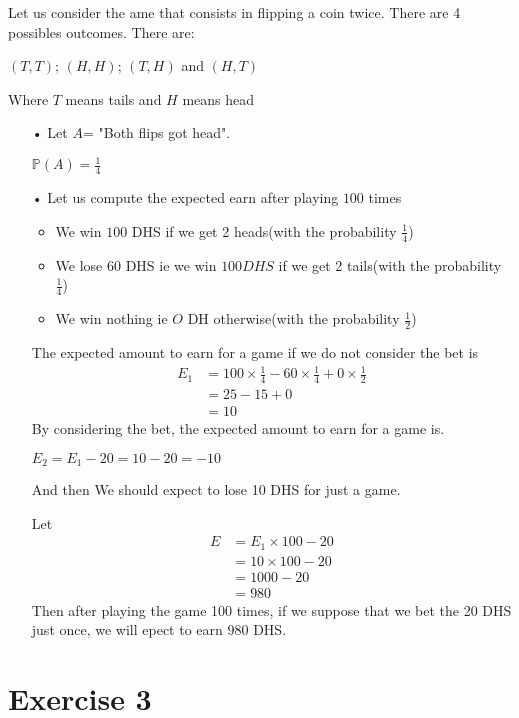 \documentclass[11pt]{article}
\begin{document}
   Let us consider the ame that consists in flipping a coin twice.
   There are 4 possibles outcomes. There are:
   
   $(T,T)$; $(H,H)$; $(T,H)$ and $(H,T)$
   
   Where $T$ means tails and $H$ means head
   
   \begin{itemize}
   \item[•]Let  $A$= "Both flips got head".
   
   $\mathbb{P}(A)=\frac{1}{4}$
   
   \item[•] Let us compute the expected earn after playing $100$ times
   \begin{itemize}
   \item We win $100$ DHS if we get 2 heads(with the probability $\frac{1}{4}$)
   
  \item We lose $60$ DHS ie we win $100 DHS$ if we get 2 tails(with the probability $\frac{1}{4}$)
  \item We win nothing ie $O$ DH otherwise(with the probability $\frac{1}{2}$)
  
  
   
   \end{itemize}
   
The expected amount to earn for a game if we do not consider the bet is 
\begin{align*}
E_1 &=100\times \frac{1}{4}-60\times \frac{1}{4}+0 \times \frac{1}{2}\\
       &=25-15+0\\
       &=10
\end{align*}
By considering the bet, the expected amount to earn for a game is. 

$E_2=E_1-20=10-20=-10$

And then We should expect to lose 10 DHS for just a game.

Let
\begin{align*}
E &=E_1\times 100-20\\
       &=10\times 100-20\\
       &=1000-20\\
       &=980
\end{align*} 
Then after playing the game 100 times, if we suppose that we bet the 20 DHS just once, we will epect to earn 980 DHS.
\end{itemize}
   
   
\newpage 
    \section{Exercise 3}
    
\end{document}
